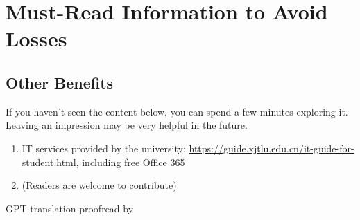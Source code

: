 
\chapter{Must-Read Information to Avoid Losses}
\label{fuli}






% 

\section{Other Benefits}

If you haven't seen the content below, you can spend a few minutes exploring it. Leaving an impression may be very helpful in the future.

\begin{enumerate}
    \item IT services provided by the university: \url{https://guide.xjtlu.edu.cn/it-guide-for-student.html}, including free Office 365
    \item (Readers are welcome to contribute)
\end{enumerate}

\begin{flushright}
    GPT translation proofread by \Shiyao
\end{flushright}